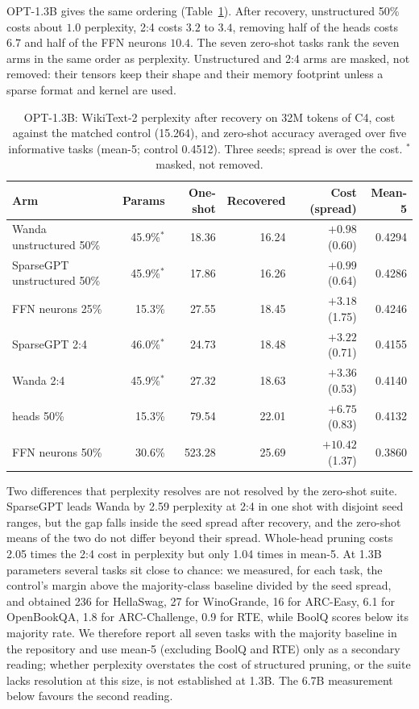 \documentclass[11pt,a4paper]{article}
\begin{document}
OPT-1.3B gives the same ordering (Table~\ref{tab:opt}). After recovery, unstructured 50\% costs about $1.0$ perplexity, 2:4 costs $3.2$ to $3.4$, removing half of the heads costs $6.7$ and half of the FFN neurons $10.4$. The seven zero-shot tasks rank the seven arms in the same order as perplexity. Unstructured and 2:4 arms are masked, not removed: their tensors keep their shape and their memory footprint unless a sparse format and kernel are used.

\begin{table}[t]
\centering
\caption{OPT-1.3B: WikiText-2 perplexity after recovery on 32M tokens of C4, cost against the matched control (15.264), and zero-shot accuracy averaged over five informative tasks (mean-5; control 0.4512). Three seeds; spread is over the cost. $^*$masked, not removed.}
\label{tab:opt}
\begin{tabular}{lrrrrr}
\toprule
Arm & Params & One-shot & Recovered & Cost (spread) & Mean-5 \\
\midrule
Wanda unstructured 50\% & 45.9\%$^*$ & 18.36 & 16.24 & $+0.98$ (0.60) & 0.4294 \\
SparseGPT unstructured 50\% & 45.9\%$^*$ & 17.86 & 16.26 & $+0.99$ (0.64) & 0.4286 \\
FFN neurons 25\% & 15.3\% & 27.55 & 18.45 & $+3.18$ (1.75) & 0.4246 \\
SparseGPT 2:4 & 46.0\%$^*$ & 24.73 & 18.48 & $+3.22$ (0.71) & 0.4155 \\
Wanda 2:4 & 45.9\%$^*$ & 27.32 & 18.63 & $+3.36$ (0.53) & 0.4140 \\
heads 50\% & 15.3\% & 79.54 & 22.01 & $+6.75$ (0.83) & 0.4132 \\
FFN neurons 50\% & 30.6\% & 523.28 & 25.69 & $+10.42$ (1.37) & 0.3860 \\
\bottomrule
\end{tabular}
\end{table}

Two differences that perplexity resolves are not resolved by the zero-shot suite. SparseGPT leads Wanda by 2.59 perplexity at 2:4 in one shot with disjoint seed ranges, but the gap falls inside the seed spread after recovery, and the zero-shot means of the two do not differ beyond their spread. Whole-head pruning costs 2.05 times the 2:4 cost in perplexity but only 1.04 times in mean-5. At 1.3B parameters several tasks sit close to chance: we measured, for each task, the control's margin above the majority-class baseline divided by the seed spread, and obtained 236 for HellaSwag, 27 for WinoGrande, 16 for ARC-Easy, 6.1 for OpenBookQA, 1.8 for ARC-Challenge, 0.9 for RTE, while BoolQ scores below its majority rate. We therefore report all seven tasks with the majority baseline in the repository and use mean-5 (excluding BoolQ and RTE) only as a secondary reading; whether perplexity overstates the cost of structured pruning, or the suite lacks resolution at this size, is not established at 1.3B. The 6.7B measurement below favours the second reading.
\end{document}
